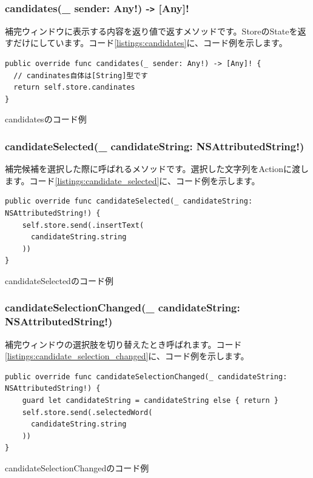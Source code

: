 \documentclass[uplatex,a4j,12pt,twocolumn]{jsarticle}
\begin{document}
\subsubsection{candidates(\_ sender: Any!) -\texttt{>} [Any]!}
補完ウィンドウに表示する内容を返り値で返すメソッドです。StoreのStateを返すだけにしています。コード\ref{listings:candidates}に、コード例を示します。
\begin{listing}[h]
  \begin{verbatim}
public override func candidates(_ sender: Any!) -> [Any]! {
  // candinates自体は[String]型です
  return self.store.candinates
}
  \end{verbatim}
  \caption{candidatesのコード例}\label{listings:candidates}
\end{listing}

\subsubsection{candidateSelected(\_ candidateString: NSAttributedString!)}
補完候補を選択した際に呼ばれるメソッドです。選択した文字列をActionに渡します。コード\ref{listings:candidate_selected}に、コード例を示します。
\begin{listing}[h]
  \begin{verbatim}
public override func candidateSelected(_ candidateString: NSAttributedString!) {
    self.store.send(.insertText(
      candidateString.string
    ))
}
  \end{verbatim}
  \caption{candidateSelectedのコード例}\label{listings:candidate_selected}
\end{listing}

\subsubsection{candidateSelectionChanged(\_ candidateString: NSAttributedString!)}
補完ウィンドウの選択肢を切り替えたとき呼ばれます。コード\ref{listings:candidate_selection_changed}に、コード例を示します。
\begin{listing}[h]
  \begin{verbatim}
public override func candidateSelectionChanged(_ candidateString: NSAttributedString!) {
    guard let candidateString = candidateString else { return }
    self.store.send(.selectedWord(
      candidateString.string
    ))
}
  \end{verbatim}
  \caption{candidateSelectionChangedのコード例}\label{listings:candidate_selection_changed}
\end{listing}
\end{document}
